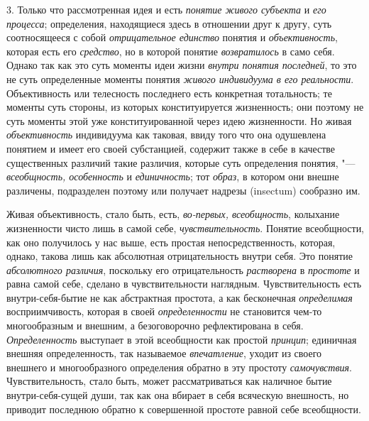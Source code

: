 3. Только что рассмотренная идея и есть {\em понятие живого субъекта}
и {\em его процесса}; определения, находящиеся здесь в отношении друг к другу,
суть соотносящееся с собой {\em отрицательное единство} понятия и
{\em объективность}, которая есть его {\em средство}, но в которой понятие
{\em возвратилось} в само себя. Однако так как это суть моменты идеи жизни
{\em внутри понятия последней}, то это не суть определенные моменты понятия
{\em живого индивидуума в его реальности}.
Объективность или телесность последнего есть
конкретная тотальность; те моменты суть стороны, из которых конституируется
жизненность; они поэтому не суть моменты этой уже конституированной через
идею жизненности. Но живая {\em объективность}
индивидуума как таковая, ввиду того что она одушевлена
понятием и имеет его своей субстанцией, содержит также в себе в качестве
существенных различий такие различия, которые суть определения понятия, "---
{\em всеобщность, особенность} и {\em единичность}; тот {\em образ},
в котором они внешне различены, подразделен поэтому или
получает надрезы (insectum) сообразно
им.

Живая объективность, стало быть, есть, {\em во-первых, всеобщность},
колыхание жизненности чисто лишь в самой себе, {\em чувствительность}.
Понятие всеобщности, как оно получилось у нас выше, есть
простая непосредственность, которая, однако, такова лишь как абсолютная
отрицательность внутри себя. Это понятие {\em абсолютного различия},
поскольку его отрицательность {\em растворена} в {\em простоте} и равна
самой себе, сделано в чувствительности наглядным. Чувствительность есть
внутри-себя-бытие не как абстрактная простота, а как бесконечная
{\em определимая} восприимчивость, которая в своей {\em определенности} не
становится чем-то многообразным и внешним, а безоговорочно рефлектирована в
себя. {\em Определенность} выступает в этой всеобщности как простой
{\em принцип}; единичная внешняя определенность, так называемое
{\em впечатление}, уходит из своего внешнего и многообразного определения
обратно в эту простоту {\em самочувствия}.
Чувствительность, стало быть, может рассматриваться как
наличное бытие внутри-себя-сущей души, так как она вбирает в себя всяческую
внешность, но приводит последнюю обратно к совершенной простоте равной себе
всеобщности.

